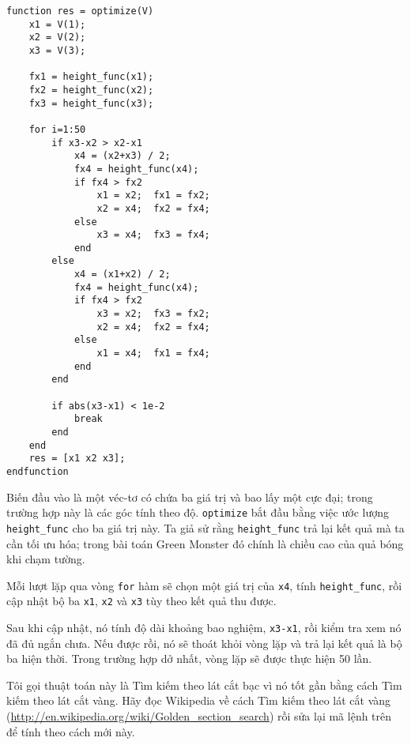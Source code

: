 \documentclass[12pt]{book}
\begin{document}
\begin{verbatim}
function res = optimize(V)
    x1 = V(1);
    x2 = V(2);
    x3 = V(3);
    
    fx1 = height_func(x1);
    fx2 = height_func(x2);
    fx3 = height_func(x3);
   
    for i=1:50
        if x3-x2 > x2-x1
            x4 = (x2+x3) / 2;
            fx4 = height_func(x4);
            if fx4 > fx2
                x1 = x2;  fx1 = fx2;
                x2 = x4;  fx2 = fx4;
            else
                x3 = x4;  fx3 = fx4;
            end
        else
            x4 = (x1+x2) / 2;
            fx4 = height_func(x4);
            if fx4 > fx2
                x3 = x2;  fx3 = fx2;
                x2 = x4;  fx2 = fx4;
            else
                x1 = x4;  fx1 = fx4;
            end
        end

        if abs(x3-x1) < 1e-2
            break
        end
    end
    res = [x1 x2 x3];
endfunction
\end{verbatim}
%
Biến đầu vào là một véc-tơ có chứa ba giá trị và bao lấy một cực đại;
trong trường hợp này là các góc tính theo độ. {\tt optimize} bắt đầu 
bằng việc ước lượng \verb#height_func# cho ba giá trị này.
Ta giả sử rằng \verb#height_func# trả lại kết quả mà ta cần 
tối ưu hóa; trong bài toán Green Monster đó chính là chiều cao của 
quả bóng khi chạm tường.

Mỗi lượt lặp qua vòng {\tt for} hàm sẽ chọn một giá trị của {\tt x4}, 
tính  \verb#height_func#, rồi cập nhật bộ ba {\tt x1}, {\tt x2} và 
{\tt x3} tùy theo kết quả thu được.

Sau khi cập nhật, nó tính độ dài khoảng bao nghiệm, {\tt x3-x1},
rồi kiểm tra xem nó đã đủ ngắn chưa. Nếu được rồi, nó sẽ thoát khỏi 
vòng lặp và trả lại kết quả là bộ ba hiện thời. Trong trường hợp dở nhất, 
vòng lặp sẽ được thực hiện 50 lần.

\begin{ex}
Tôi gọi thuật toán này là Tìm kiếm theo lát cắt bạc vì nó tốt gần bằng 
cách Tìm kiếm theo lát cắt vàng. Hãy đọc Wikipedia về cách Tìm 
kiếm theo lát cắt vàng 
(\url{http://en.wikipedia.org/wiki/Golden_section_search}) rồi sửa lại 
mã lệnh trên để tính theo cách mới này.
\end{ex}
\end{document}
